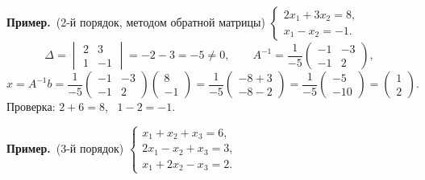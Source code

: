 \documentclass[a4paper,11pt]{article}
\newcommand{\prim}{\par\smallskip\noindent\textbf{\textcolor{teoc!80!black}{Пример.}}\ }
\begin{document}
\prim (2-й порядок, методом обратной матрицы) $\begin{cases} 2x_1 + 3x_2 = 8, \\ x_1 - x_2 = -1. \end{cases}$
\[
  \Delta = \begin{vmatrix} 2 & 3 \\ 1 & -1 \end{vmatrix} = -2 - 3 = -5 \ne 0, \qquad
  A^{-1} = \frac{1}{-5}\begin{pmatrix} -1 & -3 \\ -1 & 2 \end{pmatrix},
\]
\[
  x = A^{-1} b = \frac{1}{-5}\begin{pmatrix} -1 & -3 \\ -1 & 2 \end{pmatrix}\begin{pmatrix} 8 \\ -1 \end{pmatrix}
  = \frac{1}{-5}\begin{pmatrix} -8 + 3 \\ -8 - 2 \end{pmatrix} = \frac{1}{-5}\begin{pmatrix} -5 \\ -10 \end{pmatrix} = \begin{pmatrix} 1 \\ 2 \end{pmatrix}.
\]
Проверка: $2 + 6 = 8$, \ $1 - 2 = -1$. \checkmark

\prim (3-й порядок) $\begin{cases} x_1 + x_2 + x_3 = 6, \\ 2x_1 - x_2 + x_3 = 3, \\ x_1 + 2x_2 - x_3 = 2. \end{cases}$
\end{document}
